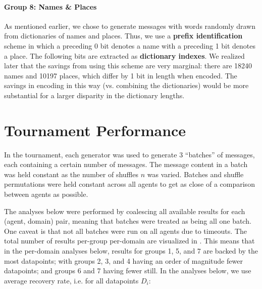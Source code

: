 \documentclass[titlepage]{article}
\begin{document}
\paragraph{Group 8: Names \& Places} As mentioned earlier, we chose to generate messages with words randomly drawn from dictionaries of names and places. Thus, we use a \textbf{prefix identification} scheme in which a preceding 0 bit denotes a name with a preceding 1 bit denotes a place. The following bits are extracted as \textbf{dictionary indexes}. We realized later that the savings from using this scheme are very marginal: there are 18240 names and 10197 places, which differ by 1 bit in length when encoded. The savings in encoding in this way (vs. combining the dictionaries) would be more substantial for a larger disparity in the dictionary lengths.

\section{Tournament Performance}
In the tournament, each generator was used to generate 3 ``batches'' of messages, each containing a certain number of messages. The message content in a batch was held constant as the number of shuffles $n$ was varied. Batches and shuffle permutations were held constant across all agents to get as close of a comparison between agents as possible.

The analyses below were performed by coalescing all available results for each (agent, domain) pair, meaning that batches were treated as being all one batch. One caveat is that not all batches were run on all agents due to timeouts. The total number of results per-group per-domain are visualized in . This means that in the per-domain analyses below, results for groups 1, 5, and 7 are backed by the most datapoints; with groups 2, 3, and 4 having an order of magnitude fewer datapoints; and groups 6 and 7 having fewer still. In the analyses below, we use average recovery rate, i.e. for all datapoints $D_i$:
\end{document}
